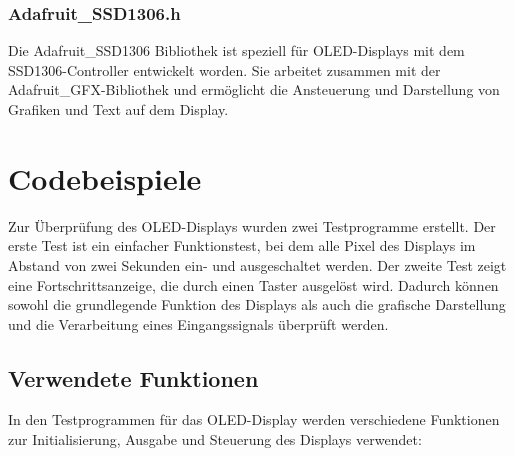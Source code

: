 \subsubsection{Adafruit\_SSD1306.h}
Die Adafruit\_SSD1306 Bibliothek ist speziell für OLED-Displays mit dem SSD1306-Controller entwickelt worden. Sie arbeitet zusammen mit der Adafruit\_GFX-Bibliothek und ermöglicht die Ansteuerung und Darstellung von Grafiken und Text auf dem Display.\cite{AdafruitGFX:2023}




\section{Codebeispiele}

Zur Überprüfung des OLED-Displays wurden zwei Testprogramme erstellt. 
Der erste Test ist ein einfacher Funktionstest, bei dem alle Pixel des Displays im Abstand von zwei Sekunden ein- und ausgeschaltet werden. 
Der zweite Test zeigt eine Fortschrittsanzeige, die durch einen Taster ausgelöst wird. 
Dadurch können sowohl die grundlegende Funktion des Displays als auch die grafische Darstellung und die Verarbeitung eines Eingangssignals überprüft werden.

\subsection{Verwendete Funktionen}

In den Testprogrammen für das OLED-Display werden verschiedene Funktionen zur Initialisierung, Ausgabe und Steuerung des Displays verwendet:


